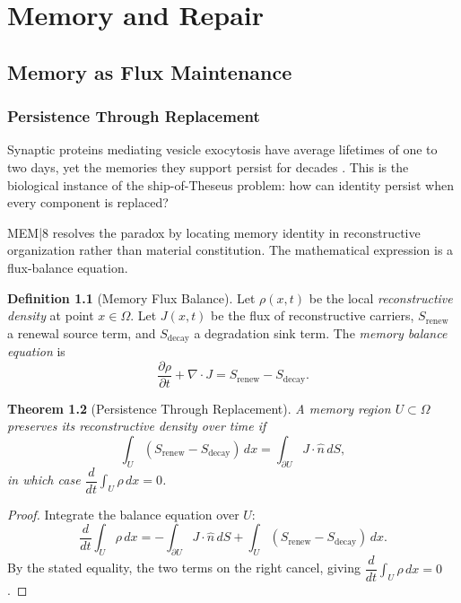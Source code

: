 \documentclass[12pt, oneside]{book}
\theoremstyle{plain}
\newtheorem{theorem}{Theorem}[chapter]
\theoremstyle{definition}
\newtheorem{definition}[theorem]{Definition}
\theoremstyle{remark}
\begin{document}
\part{Memory and Repair}

\chapter{Memory as Flux Maintenance}

\section{Persistence Through Replacement}

Synaptic proteins mediating vesicle exocytosis have
average lifetimes of one to two days, yet the memories
they support persist for decades \cite{Parkes2023}.
This is the biological instance of the ship-of-Theseus
problem: how can identity persist when every component
is replaced?

MEM|8 resolves the paradox by locating memory identity
in reconstructive organization rather than material
constitution.
The mathematical expression is a flux-balance equation.

\begin{definition}[Memory Flux Balance]
\label{def:flux}
Let $\rho(x, t)$ be the local \emph{reconstructive density}
at point $x \in \Omega$.
Let $J(x, t)$ be the flux of reconstructive carriers,
$S_{\mathrm{renew}}$ a renewal source term, and
$S_{\mathrm{decay}}$ a degradation sink term.
The \emph{memory balance equation} is
\[
  \frac{\partial \rho}{\partial t}
  + \nabla \cdot J
  = S_{\mathrm{renew}} - S_{\mathrm{decay}}.
\]
\end{definition}

\begin{theorem}[Persistence Through Replacement]
\label{thm:ptr}
A memory region $U \subset \Omega$ preserves its
reconstructive density over time if
\[
  \int_U (S_{\mathrm{renew}} - S_{\mathrm{decay}})\,dx
  = \int_{\partial U} J \cdot \hat{n}\,dS,
\]
in which case $\dfrac{d}{dt}\displaystyle\int_U \rho\,dx = 0$.
\end{theorem}

\begin{proof}
Integrate the balance equation over $U$:
\[
  \frac{d}{dt}\int_U \rho\,dx
  = -\int_{\partial U} J \cdot \hat{n}\,dS
    + \int_U (S_{\mathrm{renew}} - S_{\mathrm{decay}})\,dx.
\]
By the stated equality, the two terms on the right cancel,
giving $\dfrac{d}{dt}\displaystyle\int_U \rho\,dx = 0$.
\end{proof}
\end{document}
